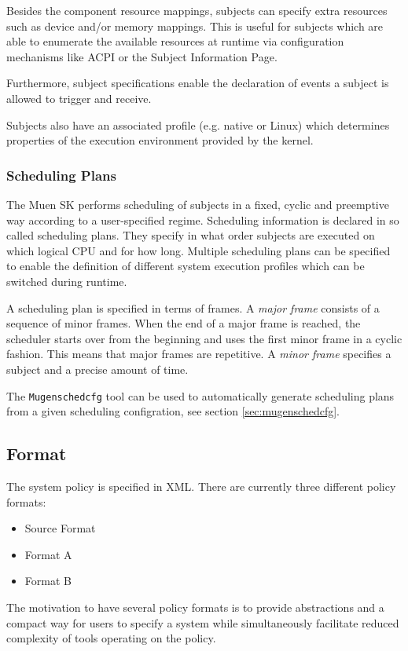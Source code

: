 \documentclass[a4paper,twoside,titlepage]{article}
\begin{document}
Besides the component resource mappings, subjects can specify extra resources
such as device and/or memory mappings. This is useful for subjects which are
able to enumerate the available resources at runtime via configuration
mechanisms like ACPI or the Subject Information Page.

Furthermore, subject specifications enable the declaration of events a subject
is allowed to trigger and receive.

Subjects also have an associated profile (e.g. native or Linux) which determines
properties of the execution environment provided by the kernel.

\subsubsection{Scheduling Plans}
The Muen SK performs scheduling of subjects in a fixed, cyclic and
preemptive way according to a user-specified regime. Scheduling information is
declared in so called scheduling plans. They specify in what order subjects are
executed on which logical CPU and for how long. Multiple scheduling plans can be
specified to enable the definition of different system execution profiles which
can be switched during runtime.

A scheduling plan is specified in terms of frames. A \emph{major frame} consists
of a sequence of minor frames. When the end of a major frame is reached, the
scheduler starts over from the beginning and uses the first minor frame in a
cyclic fashion. This means that major frames are repetitive. A
\emph{minor frame} specifies a subject and a precise amount of time.

The \texttt{Mugenschedcfg} tool can be used to automatically generate
scheduling plans from a given scheduling configration, see section
\ref{sec:mugenschedcfg}.

\subsection{Format}
The system policy is specified in XML. There are currently three different
policy formats:

\begin{itemize}
	\item Source Format
	\item Format A
	\item Format B
\end{itemize}

The motivation to have several policy formats is to provide abstractions and a
compact way for users to specify a system while simultaneously facilitate
reduced complexity of tools operating on the policy.
\end{document}
